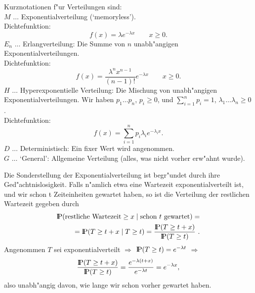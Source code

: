 Kurznotationen f"ur Verteilungen sind: \\
$M$ $\dots$ Exponentialverteilung (`memoryless'). \\ 
Dichtefunktion:
\begin{displaymath}
f(x) = \lambda e^{-\lambda x} \qquad x\geq 0.
\end{displaymath}
$E_{n}$ $\dots$ Erlangverteilung: Die Summe von $n$ unabh"angigen
Exponentialverteilungen.\\
 Dichtefunktion:
\begin{displaymath}
f(x)=\frac{\lambda^{n}x^{n-1}}{(n-1)!}e^{-\lambda x} \qquad x\geq 0.
\end{displaymath} 
$H$ $\dots$ Hyperexponentielle Verteilung: Die Mischung von unabh"angigen
Exponentialverteilungen. Wir haben $p_{1} \dots p_{n}$,  $p_{i} \geq 0$,
 und
$\sum_{i=1}^{n} p_{i} = 1$, $\lambda_{1} \dots \lambda_{n} \geq 0$. \\
Dichtefunktion:
\begin{displaymath}
f(x)=\sum_{i=1}^{n} p_{i} \lambda_{i} e^{-\lambda_{i}x}.
\end{displaymath}
$D$ $\dots$ Deterministisch: Ein fixer Wert wird angenommen. \\
$G$ $\dots$ `General': Allgemeine Verteilung (alles, was nicht vorher erw"ahnt
wurde). 

Die Sonderstellung der Exponentialverteilung ist begr"undet durch ihre
Ged"achtnislosigkeit. Falls n"amlich etwa eine Wartezeit
exponentialverteilt ist, und wir schon t Zeiteinheiten gewartet haben, so
ist die Verteilung der restlichen Wartezeit gegeben durch
\begin{eqnarray*}
{\rm I\kern-0.2em P}(\mbox{restliche Wartezeit} \geq x \mid \mbox{schon $t$
gewartet}) = \\
= {\rm I\kern-0.2em P}(T \geq t+x \mid T \geq t) = \frac{{\rm I\kern-0.2em P}(T \geq t+x)}{{\rm I\kern-0.2em P}(T\geq t)} ~.   
\end{eqnarray*}  
Angenommen $T$  sei exponentialverteilt $\Rightarrow$ ${\rm I\kern-0.2em P}(T \geq t) =
e^{-\lambda t}$  $\Rightarrow$
\begin{displaymath}
\frac{{\rm I\kern-0.2em P}(T \geq t+x)}{{\rm I\kern-0.2em P}(T \geq t)} = \frac{e^{-\lambda
(t+x)}}{e^{-\lambda
t}}= e^{-\lambda x},
\end{displaymath} 
also unabh"angig davon, wie lange wir schon vorher gewartet haben.

